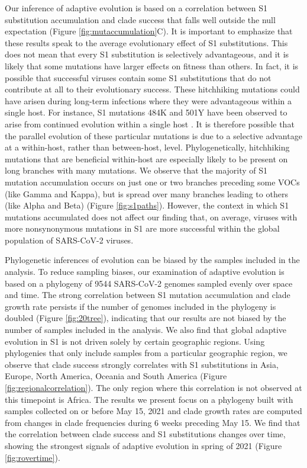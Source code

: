 \documentclass[11pt,oneside,letterpaper]{article}
\begin{document}
Our inference of adaptive evolution is based on a correlation between S1 substitution accumulation and clade success that falls well outside the null expectation (Figure \ref{fig:mutaccumulation}C).
It is important to emphasize that these results speak to the average evolutionary effect of S1 substitutions. 
This does not mean that every S1 substitution is selectively advantageous, and it is likely that some mutations have larger effects on fitness than others.
In fact, it is possible that successful viruses contain some S1 substitutions that do not contribute at all to their evolutionary success. 
These hitchhiking mutations could have arisen during long-term infections where they were advantageous within a single host. 
For instance, S1 mutations 484K and 501Y have been observed to arise from continued evolution within a single host \cite{Choi2020-to}.
It is therefore possible that the parallel evolution of these particular mutations is due to a selective advantage at a within-host, rather than between-host, level. 
Phylogenetically, hitchhiking mutations that are beneficial within-host are especially likely to be present on long branches with many mutations.
We observe that the majority of S1 mutation accumulation occurs on just one or two branches preceding some VOCs (like Gamma and Kappa), but is spread over many branches leading to others (like Alpha and Beta) (Figure \ref{fig:s1paths}). 
However, the context in which S1 mutations accumulated does not affect our finding that, on average, viruses with more nonsynonymous mutations in S1 are more successful within the global population of SARS-CoV-2 viruses.

Phylogenetic inferences of evolution can be biased by the samples included in the analysis. 
To reduce sampling biases, our examination of adaptive evolution is based on a phylogeny of 9544 SARS-CoV-2 genomes sampled evenly over space and time. 
The strong correlation between S1 mutation accumulation and clade growth rate persists if the number of genomes included in the phylogeny is doubled (Figure \ref{fig:20tree}), indicating that our results are not biased by the number of samples included in the analysis.
We also find that global adaptive evolution in S1 is not driven solely by certain geographic regions. 
Using phylogenies that only include samples from a particular geographic region, we observe that clade success strongly correlates with S1 substitutions in Asia, Europe, North America, Oceania and South America (Figure \ref{fig:regionalcorrelation}). 
The only region where this correlation is not observed at this timepoint is Africa.
The results we present focus on a phylogeny built with samples collected on or before May 15, 2021 and clade growth rates are computed from changes in clade frequencies during 6 weeks preceding May 15.
We find that the correlation between clade success and S1 substitutions changes over time, showing the strongest signals of adaptive evolution in spring of 2021 (Figure \ref{fig:rovertime}). 
\end{document}
